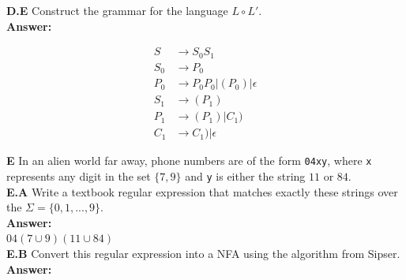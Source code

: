 \documentclass[10pt]{article}
\begin{document}
    \noindent
    \textbf{D.E} Construct the grammar for the language $L\circ L'.$\\
    
    \noindent
    \textbf{Answer:}
    
    \begin{align*}
        S &\to S_0S_1\\
        S_0 &\to P_0\\
        P_0 &\to P_0P_0|(P_0)|\epsilon\\
        S_1&\to (P_1)\\
        P_1 &\to (P_1)|C_1)\\
        C_1 &\to C_1)|\epsilon
    \end{align*}


    \newpage
    \noindent
    \textbf{E} In an alien world far away, phone numbers are of the form \texttt{04xy}, where \texttt{x} represents any digit in the set $\{7,9\}$ and \texttt{y} is either the string $11$ or $84.$\\

    \noindent
    \textbf{E.A}  Write a textbook regular expression that matches exactly these strings over the $\Sigma=\{0,1,...,9\}.$\\
    
    \noindent
    \textbf{Answer:}\\
    $04(7\cup9)(11\cup84)$\\

    \noindent
    \textbf{E.B}  Convert this regular expression into a NFA using the algorithm from Sipser.\\

    \noindent
    \textbf{Answer:}\\
\end{document}
